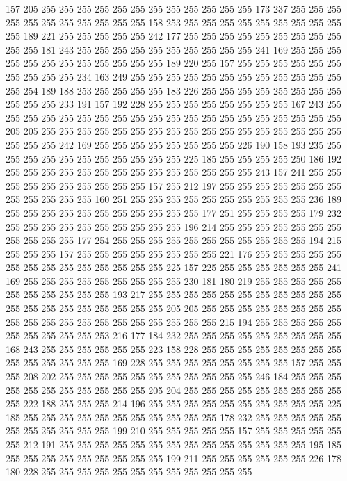 157 205 255 255 255 255 255 255 255 255 255 255 255 255 173 237 255 255 255 255
255 255 255 255 255 255 255 158 253 255 255 255 255 255 255 255 255 255 255 189
221 255 255 255 255 255 242 177 255 255 255 255 255 255 255 255 255 255 255 181
243 255 255 255 255 255 255 255 255 255 255 241 169 255 255 255 255 255 255 255
255 255 255 255 255 189 220 255 157 255 255 255 255 255 255 255 255 255 255 234
163 249 255 255 255 255 255 255 255 255 255 255 255 255 255 254 189 188 253 255
255 255 255 183 226 255 255 255 255 255 255 255 255 255 255 255 233 191 157 192
228 255 255 255 255 255 255 255 255 167 243 255 255 255 255 255 255 255 255 255
255 255 255 255 255 255 255 255 255 255 255 205 205 255 255 255 255 255 255 255
255 255 255 255 255 255 255 255 255 255 255 255 255 242 169 255 255 255 255 255
255 255 255 226 190 158 193 235 255 255 255 255 255 255 255 255 255 255 255 225
185 255 255 255 255 250 186 192 255 255 255 255 255 255 255 255 255 255 255 255
255 255 243 157 241 255 255 255 255 255 255 255 255 255 255 157 255 212 197 255
255 255 255 255 255 255 255 255 255 255 255 160 251 255 255 255 255 255 255 255
255 255 255 236 189 255 255 255 255 255 255 255 255 255 255 255 177 251 255 255
255 255 179 232 255 255 255 255 255 255 255 255 255 255 196 214 255 255 255 255
255 255 255 255 255 255 255 177 254 255 255 255 255 255 255 255 255 255 255 255
194 215 255 255 255 157 255 255 255 255 255 255 255 255 221 176 255 255 255 255
255 255 255 255 255 255 255 255 255 255 225 157 225 255 255 255 255 255 255 241
169 255 255 255 255 255 255 255 255 255 230 181 180 219 255 255 255 255 255 255
255 255 255 255 255 193 217 255 255 255 255 255 255 255 255 255 255 255 255 255
255 255 255 255 255 255 255 205 205 255 255 255 255 255 255 255 255 255 255 255
255 255 255 255 255 255 255 255 255 215 194 255 255 255 255 255 255 255 255 255
255 253 216 177 184 232 255 255 255 255 255 255 255 255 255 168 243 255 255 255
255 255 255 223 158 228 255 255 255 255 255 255 255 255 255 255 255 255 255 255
169 228 255 255 255 255 255 255 255 255 157 255 255 255 208 202 255 255 255 255
255 255 255 255 255 255 255 246 184 255 255 255 255 255 255 255 255 255 255 255
205 204 255 255 255 255 255 255 255 255 255 255 222 188 255 255 255 214 196 255
255 255 255 255 255 255 255 255 255 225 185 255 255 255 255 255 255 255 255 255
255 255 178 232 255 255 255 255 255 255 255 255 255 255 255 199 210 255 255 255
255 255 157 255 255 255 255 255 255 212 191 255 255 255 255 255 255 255 255 255
255 255 255 255 255 195 185 255 255 255 255 255 255 255 255 255 199 211 255 255
255 255 255 255 226 178 180 228 255 255 255 255 255 255 255 255 255 255 255 255
